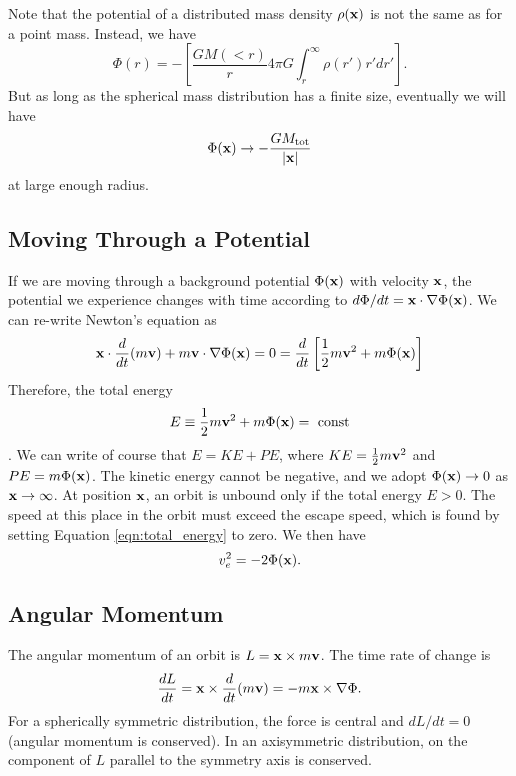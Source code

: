 \documentclass[]{article}
\begin{document}
Note that the potential of a distributed mass density $\rho(\mathbf{x})$
is not the same as for a point mass.  Instead, we have
\begin{equation}
\Phi(r) = - \left[ \frac{GM(<r)}{r} 4 \pi G \int_{r}^{\infty} \rho(r') r' dr'\right].
\end{equation}
\noindent
But as long as the spherical mass distribution has a finite size, eventually we 
will have
\begin{equation}
\Phi(\mathbf{x}) \to - \frac{G M_{\mathrm{tot}}}{|\mathbf{x}|}
\end{equation}
\noindent
at large enough radius.


\subsection{Moving Through a Potential}

If we are moving through a background potential $\Phi(\mathbf{x})$ with
velocity $\mathbf{x}$, the potential we experience changes
with time according to $d\Phi/dt = \mathbf{x}\cdot\nabla\Phi(\mathbf{x})$.
We can re-write Newton's equation as
\begin{equation}
\mathbf{x} \cdot \frac{d}{dt} ( m\mathbf{v}) + m \mathbf{v}\cdot\nabla \Phi(\mathbf{x}) = 0 = \frac{d}{dt}\left[\frac{1}{2}m\mathbf{v}^{2} + m \Phi(\mathbf{x})\right]
\end{equation}
\noindent
Therefore, the total energy
\begin{equation}
\label{eqn:total_energy}
E \equiv \frac{1}{2} m\mathbf{v}^{2} + m\Phi(\mathbf{x}) =~\mathrm{const}
\end{equation}
\noindent.
We can write of course that $E = KE + PE$, where $KE = \frac{1}{2}m\mathbf{v}^{2}$ and $PE = m\Phi(\mathbf{x})$.
The kinetic energy cannot be negative, and we adopt $\Phi(\mathbf{x})\to0$ as $\mathbf{x}\to\infty$.  At position
$\mathbf{x}$, an orbit is unbound only if the total energy $E>0$. The speed at this place in the
orbit must exceed the escape speed, which is found by setting Equation \ref{eqn:total_energy} to zero.
We then have
\begin{equation}
v_{e}^{2} = - 2 \Phi(\mathbf{x}).
\end{equation}

\subsection{Angular Momentum}

The angular momentum of an orbit is $L = \mathbf{x} \times m\mathbf{v}$. The time rate of change is
\begin{equation}
\frac{dL}{dt} = \mathbf{x} \times \frac{d}{dt} (m \mathbf{v}) = -m\mathbf{x} \times \nabla \Phi.
\end{equation}
\noindent
For a spherically symmetric distribution, the force is central and $dL/dt = 0$ (angular
momentum is conserved).
In an axisymmetric distribution, on the component of $L$ parallel to the symmetry
axis is conserved.
\end{document}
